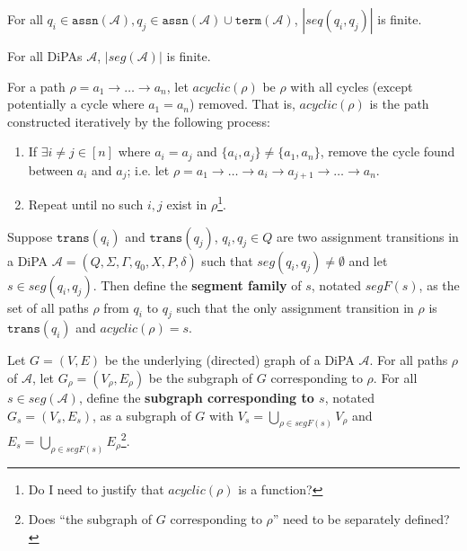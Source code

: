 \documentclass[12pt]{article}
\newcommand{\trans}{\texttt{trans}}
\theoremstyle{definition}
\begin{document}
\begin{prop}
	For all $q_i\in \texttt{assn}(\mathcal{A}), q_j \in \texttt{assn}(\mathcal{A})\cup\texttt{term}(\mathcal{A})$, $|seq(q_i, q_j)|$ is finite. 
\end{prop}

\begin{cor}
	For all DiPAs $\mathcal{A}$, $|seg(\mathcal{A})|$ is finite. 
\end{cor}


\begin{defn}
	For a path $\rho = a_1\to\ldots \to a_n$, let $acyclic(\rho)$ be $\rho$ with all cycles (except potentially a cycle where $a_1 = a_n$) removed. That is, $acyclic(\rho)$ is the path constructed iteratively by the following process:
	\begin{enumerate}
		\item If $\exists i\neq j\in [n]$ where $a_i = a_j$ and $\{a_i, a_j\}\neq \{a_1, a_n\}$, remove the cycle found between $a_i$ and $a_j$; i.e. let $\rho = a_1\to\ldots\to a_i\to a_{j+1}\to\ldots\to a_n$.
		\item Repeat until no such $i, j$ exist in $\rho$\footnote{\color{red} Do I need to justify that $acyclic(\rho)$ is a function?}.
	\end{enumerate}
	
\end{defn}


\begin{defn}
	Suppose $\trans(q_i)$ and $\trans(q_j)$, $q_i, q_j \in Q$ are two assignment transitions in a DiPA $\mathcal{A} = (Q, \Sigma, \Gamma, q_0, X, P, \delta)$ such that $seg(q_i, q_j)\neq \emptyset$ and let $s \in seg(q_i, q_j)$. Then define the \textbf{segment family} of $s$, notated $segF(s)$, as the set of all paths $\rho$ from $q_i$ to $q_j$ such that the only assignment transition in $\rho$ is $\trans(q_i)$ and $acyclic(\rho) = s$.
\end{defn}

\begin{defn}
	Let $G = (V, E)$ be the underlying (directed) graph of a DiPA $\mathcal{A}$. For all paths $\rho$ of $\mathcal{A}$, let $G_\rho = (V_\rho, E_\rho)$ be the subgraph of $G$ corresponding to $\rho$. 
	For all $s\in seg(\mathcal{A})$, define the \textbf{subgraph corresponding to $s$}, notated $G_s = (V_s, E_s)$, as a subgraph of $G$ with $V_s= \bigcup_{\rho\in segF(s)}V_\rho$ and $E_s= \bigcup_{\rho\in segF(s)}E_\rho$\footnote{\color{red} Does ``the subgraph of $G$ corresponding to $\rho$'' need to be separately defined?}.
\end{defn}
\end{document}
